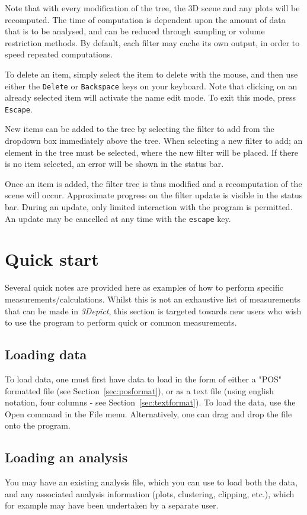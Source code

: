 \documentclass[10pt]{article}
\begin{document}
Note that with every modification of the tree, the 3D scene and any plots will be recomputed. The time of computation is dependent upon the amount of data that is to be analysed, and can be reduced through sampling or volume restriction methods. By default, each filter may cache its own output, in order to speed repeated computations.

To delete an item, simply select the item to delete with the mouse, and then use either the \texttt{Delete}  or  \texttt{Backspace} keys on your keyboard. Note that clicking on an already selected item will activate the name edit mode. To exit this mode, press \texttt{Escape}. 

New items can be added to the tree by selecting the filter to add from the dropdown box immediately above the tree. When selecting a new filter to add; an element in the tree must be selected, where the new filter will be placed. If there is no item selected, an error will be shown in the status bar.  

Once an item is added, the filter tree is thus modified and a recomputation of the scene will occur. Approximate progress on the filter update is visible in the status bar. During an update, only limited interaction with the program is permitted. An update may be cancelled at any time with the \texttt{escape} key. 


\section{Quick start}
Several quick notes are provided here as examples of how to perform specific measurements/calculations. Whilst this is not an exhaustive list of measurements that can be made in \emph{3Depict}, this section is targeted towards new users who wish to use the program to perform quick or common measurements.

\subsection{Loading data}
\label{sec:quickStartLoadData}
To load data, one must first have data to load in the form of either a "POS" formatted file (see Section~\ref{sec:posformat}), or as a text file (using english notation, four columns - see Section~\ref{sec:textformat}). To load the data, use the Open command in the File menu. Alternatively, one can drag and drop the file onto the program.

\subsection{Loading an analysis}
You may have an existing analysis file, which you can use to load both the data, and any associated analysis information (plots, clustering, clipping, etc.), which for example may have been undertaken by a separate user. 
\end{document}
